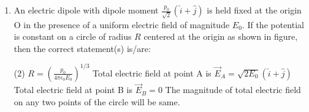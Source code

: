 
\begin{enumerate}
    \item An electric dipole with dipole moment $\frac{p_0}{\sqrt{2}}(\hat{i} + \hat{j})$ is held fixed at the origin O in the presence of a uniform electric field of magnitude $E_0$. If the potential is constant on a circle of radius $R$ centered at the origin as shown in figure, then the correct statement(s) is/are:
        \begin{tasks}(2)
            	\task $R = \left( \frac{p_0}{4\pi\epsilon_0E_0} \right)^{1/3}$
            	\task Total electric field at point A is $\vec{E}_A = \sqrt{2E_0}(\hat{i} + \hat{j})$
            	\task Total electric field at point B is $\vec{E}_B = 0$
            	\task The magnitude of total electric field on any two points of the circle will be same.
        \end{tasks}
    \centering
\end{enumerate}
